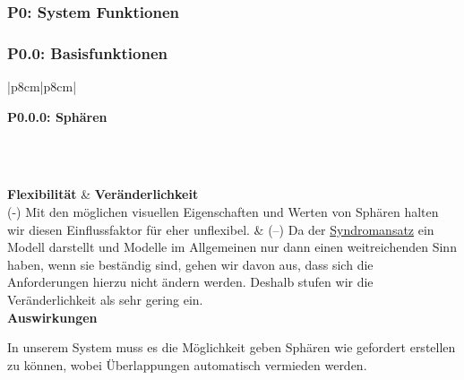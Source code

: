 \documentclass[enabledeprecatedfontcommands,fontsize=11pt,paper=a4,twoside]{scrartcl}
\newcounter{one}
\newcounter{two}[one]
\newcounter{three}[two]
\newcommand{\tone}{0\theone}
\newcommand{\ttwo}{0\thetwo}
\newcommand{\one}{\stepcounter{one}0\theone}
\newcommand{\two}{\stepcounter{two}0\thetwo}
\newcommand{\three}{\stepcounter{three}0\thethree}
\begin{document}
\newpage
\setcounter{two}{1}
\subsubsection*{\hypertarget{l}{P\one}: System Funktionen}
\subsubsection*{\hypertarget{m}{P\tone.\two}: Basisfunktionen} 
\begin{tabular} {|p{8cm}|p{8cm}|}
	\hline
	 {\parbox{16cm}{\textbf{\hypertarget{n}{P\tone.\ttwo.\three}: Sphären}} } \\ \hline\hline 
	\rule{0pt}{5ex}\\ [2ex] \hline
	\textbf{Flexibilität}  & \textbf{Veränderlichkeit} \\
	(-) Mit den möglichen visuellen Eigenschaften und Werten von Sphären halten wir diesen Einflussfaktor für eher unflexibel. & 
	(–) Da der \hyperlink{Syndromansatz}{Syndromansatz} ein Modell darstellt und Modelle im Allgemeinen nur dann einen weitreichenden Sinn haben, wenn sie beständig sind, gehen wir davon aus, dass sich die Anforderungen hierzu nicht ändern werden. Deshalb stufen wir die Veränderlichkeit als sehr gering ein.\\
	\hline
	 {\textbf{Auswirkungen}} \\
	 {\parbox{16cm}{In unserem System muss es die Möglichkeit geben Sphären wie gefordert erstellen zu können, wobei Überlappungen automatisch vermieden werden. \\} }\\ \hline
\end{tabular}
\\ \\ \\ \\ \\
\end{document}
